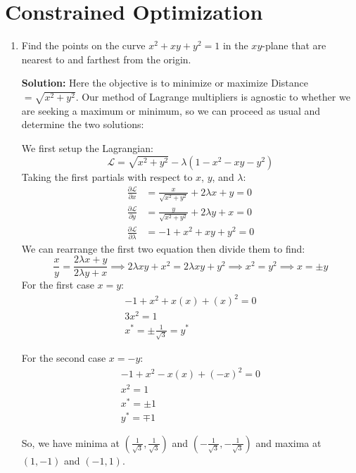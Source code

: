 \documentclass[letterpaper, 11pt]{article}
\begin{document}
\section{Constrained Optimization}
\begin{enumerate}
\item Find the points on the curve $x^2 +xy + y^2 = 1$ in the $xy$-plane that are nearest to and farthest from the origin. 
\par \textbf{Solution:} Here the objective is to minimize or maximize Distance $ = \sqrt{x^2 + y^2}$. Our method of Lagrange multipliers is agnostic to whether we are seeking a maximum or minimum, so we can proceed as usual and determine the two solutions:
\par We first setup the Lagrangian:
\[ \mathcal{L} = \sqrt{ x^2 + y^2} - \lambda( 1 - x^2 - xy - y^2) \]
Taking the first partials with respect to $x$, $y$, and $\lambda$:
\begin{align*}
\frac{ \partial \mathcal{L}}{\partial x} &= \frac{x}{\sqrt{ x^2 + y^2}} + 2 \lambda x + y = 0\\
\frac{ \partial \mathcal{L}}{\partial y} &= \frac{ y}{\sqrt{x^2 + y^2}} + 2 \lambda y + x = 0 \\
\frac{ \partial \mathcal{L}}{\partial \lambda} &= -1 + x^2  + xy + y^2 = 0 
\end{align*}
We can rearrange the first two equation then divide them to find:
\[ \frac{ x}{y} = \frac{ 2 \lambda x + y}{ 2 \lambda y + x} \implies 2\lambda xy + x^2 = 2 \lambda xy + y^2 \implies x^2 = y^2 \implies x = \pm y \]
For the first case $x = y$:
\begin{gather*}
-1 + x^2 + x(x) + (x)^2 = 0 \\
3x^2 = 1 \\
x^* = \pm \frac{1}{\sqrt{3}} = y^* 
\end{gather*}

For the second case $ x = -y$:
\begin{gather*}
-1 + x^2 - x(x) + (-x)^2 = 0\\
x^2 = 1\\
x^* = \pm 1\\
y^* = \mp 1
\end{gather*}

So, we have minima at $\left( \frac{ 1}{\sqrt{3}}, \frac{ 1}{\sqrt{3}} \right)$ and $\left( -\frac{ 1}{\sqrt{3}}, -\frac{ 1}{\sqrt{3}} \right)$ and maxima at $(1,-1)$ and $(-1,1)$. 



\end{enumerate}
\end{document}
